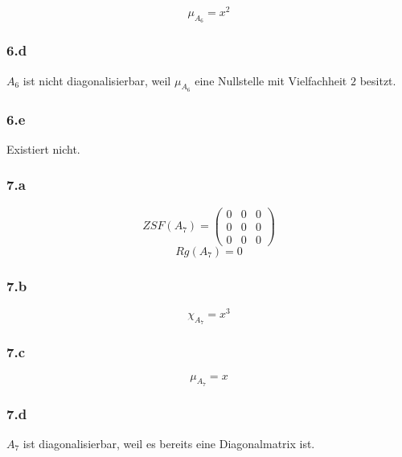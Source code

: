 \documentclass[10pt,a4paper]{article}
\begin{document}
\begin{equation}
\mu_{A_{6}} = x^{2}
\end{equation}

\subsubsection*{6.d}

$A_{6}$ ist nicht diagonalisierbar, weil $\mu_{A_{6}}$ eine Nullstelle mit Vielfachheit $2$ besitzt.

\subsubsection*{6.e}

Existiert nicht.

\subsubsection*{7.a}

\begin{equation}
ZSF(A_{7}) = 
\begin{pmatrix}
0 & 0 & 0\\
0 & 0 & 0\\
0 & 0 & 0
\end{pmatrix}
\end{equation}
\begin{equation}
Rg(A_{7}) = 0
\end{equation}

\subsubsection*{7.b}

\begin{equation}
\chi_{A_{7}} = x^{3}
\end{equation}

\subsubsection*{7.c}

\begin{equation}
\mu_{A_{7}} = x
\end{equation}

\subsubsection*{7.d}

$A_{7}$ ist diagonalisierbar, weil es bereits eine Diagonalmatrix ist.
\end{document}
